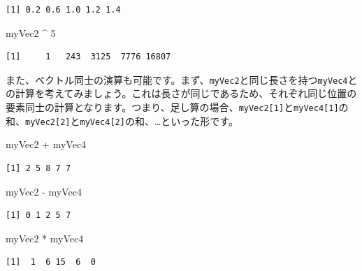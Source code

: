 \documentclass[
  a4paper,
  pandoc,
  ja=standard,
  jafont=haranoaji]{bxjsbook}
\newenvironment{Shaded}{\begin{snugshade}}{\end{snugshade}}
\newcommand{\DecValTok}[1]{\textcolor[rgb]{0.68,0.00,0.00}{#1}}
\newcommand{\NormalTok}[1]{\textcolor[rgb]{0.00,0.48,0.65}{#1}}
\newcommand{\SpecialCharTok}[1]{\textcolor[rgb]{0.37,0.37,0.37}{#1}}
\begin{document}
\begin{verbatim}
[1] 0.2 0.6 1.0 1.2 1.4
\end{verbatim}

\begin{Shaded}
\begin{Highlighting}[numbers=left,,]
\NormalTok{myVec2 }\SpecialCharTok{\^{}} \DecValTok{5}
\end{Highlighting}
\end{Shaded}

\begin{verbatim}
[1]     1   243  3125  7776 16807
\end{verbatim}

また、ベクトル同士の演算も可能です。まず、\texttt{myVec2}と同じ長さを持つ\texttt{myVec4}との計算を考えてみましょう。これは長さが同じであるため、それぞれ同じ位置の要素同士の計算となります。つまり、足し算の場合、\texttt{myVec2{[}1{]}}と\texttt{myVec4{[}1{]}}の和、\texttt{myVec2{[}2{]}}と\texttt{myVec4{[}2{]}}の和、\ldots といった形です。

\begin{Shaded}
\begin{Highlighting}[numbers=left,,]
\NormalTok{myVec2 }\SpecialCharTok{+}\NormalTok{ myVec4}
\end{Highlighting}
\end{Shaded}

\begin{verbatim}
[1] 2 5 8 7 7
\end{verbatim}

\begin{Shaded}
\begin{Highlighting}[numbers=left,,]
\NormalTok{myVec2 }\SpecialCharTok{{-}}\NormalTok{ myVec4}
\end{Highlighting}
\end{Shaded}

\begin{verbatim}
[1] 0 1 2 5 7
\end{verbatim}

\begin{Shaded}
\begin{Highlighting}[numbers=left,,]
\NormalTok{myVec2 }\SpecialCharTok{*}\NormalTok{ myVec4}
\end{Highlighting}
\end{Shaded}

\begin{verbatim}
[1]  1  6 15  6  0
\end{verbatim}
\end{document}
